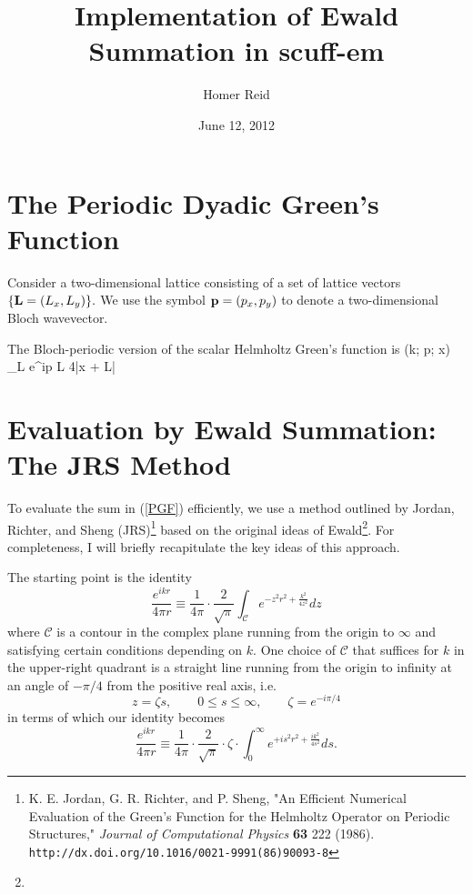 \documentclass[letterpaper]{article}
\title {Implementation of Ewald Summation in {\sc scuff-em}}
\author {Homer Reid}
\date {June 12, 2012}
\newcommand{\GB}{\overline{G}}
\begin{document}
\pagestyle{myheadings}
\maketitle

\tableofcontents

\newpage

\section{The Periodic Dyadic Green's Function}

Consider a two-dimensional lattice consisting of a set of 
lattice vectors $\{\mathbf{L}=(L_x, L_y)\}.$
We use the symbol $\mathbf{p}=(p_x, p_y)$ to denote a two-dimensional
Bloch wavevector.

The Bloch-periodic version of the scalar Helmholtz Green's function is
{ \GB(k; \vb p; \vb x) 
  \equiv 
  \sum_{\vb L} e^{i\vb p \cdot \vb L} 
                    { 4\pi|\vb x + \vb L|}
}

\section{Evaluation by Ewald Summation: The JRS Method}

To evaluate the sum in (\ref{PGF}) efficiently, we use a method 
outlined by Jordan, Richter, and Sheng (JRS)\footnote{K. E. Jordan, G. R. Richter, 
and P. Sheng, "An Efficient Numerical Evaluation of the Green's 
Function for the Helmholtz Operator on Periodic Structures," 
\textit{Journal of Computational Physics} \textbf{63} 222 (1986).
\texttt{http://dx.doi.org/10.1016/0021-9991(86)90093-8}}
based on the original ideas of Ewald\footnote{}. For completeness,
I will briefly recapitulate the key ideas of this approach.

The starting point is the identity
$$ \frac{e^{ikr}}{4\pi r} 
   \equiv 
   \frac{1}{4\pi} \cdot \frac{2}{\sqrt{\pi}}
   \int_{\mathcal C} e^{ -z^2 r^2 + \frac{k^2}{4z^2}} dz
$$ 
where $\mathcal{C}$ is a contour in the complex plane running from
the origin to $\infty$ and satisfying certain conditions depending
on $k$. One choice of $\mathcal{C}$ 
that suffices for $k$ in the upper-right quadrant is a straight line
running from the origin to infinity at an angle of $-\pi/4$ from
the positive real axis, i.e. 
$$ z=\zeta s, \qquad 0\le s \le \infty, \qquad \zeta=e^{-i\pi/4}$$
in terms of which our identity becomes
$$ \frac{e^{ikr}}{4\pi r} 
   \equiv 
   \frac{1}{4\pi} \cdot \frac{2}{\sqrt{\pi}}
   \cdot \zeta \cdot 
   \int_{0}^\infty e^{ + i s^2 r^2 + \frac{ik^2}{4s^2}} ds.
$$ 
\end{document}
